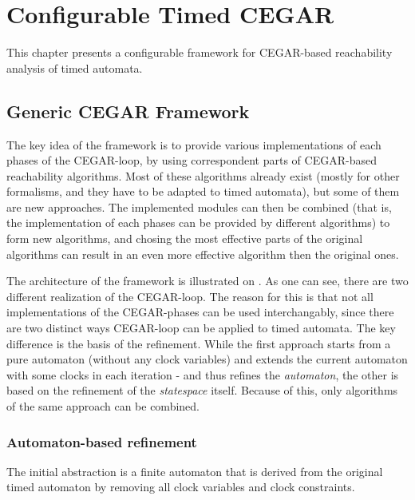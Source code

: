 \chapter{Configurable Timed CEGAR} \label{chap:timed_cegar}

This chapter presents a configurable framework for CEGAR-based reachability analysis of timed automata. 

\section{Generic CEGAR Framework}

The key idea of the framework is to provide various implementations of each phases of the CEGAR-loop, by using correspondent parts of CEGAR-based reachability algorithms. Most of these algorithms already exist (mostly for other formalisms, and they have to be adapted to timed automata), but some of them are new approaches. The implemented modules can then be combined (that is, the implementation of each phases can be provided by different algorithms) to form new algorithms, and chosing the most effective parts of the original algorithms can result in an even more effective algorithm then the original ones. 

The architecture of the framework is illustrated on . As one can see, there are two different realization of the CEGAR-loop. The reason for this is that not all implementations of the CEGAR-phases can be used interchangably, since there are two distinct ways CEGAR-loop can be applied to timed automata. The key difference is the basis of the refinement. While the first approach  starts from a pure automaton (without any clock variables) and extends the current automaton with some clocks in each iteration  - and thus refines the \emph{automaton}, the other  is based on the refinement of the \emph{statespace} itself. Because of this, only algorithms of the same approach can be combined.

\subsection{Automaton-based refinement}

 The initial abstraction is a finite automaton that is derived from the original timed automaton by removing all clock variables and clock constraints. 


